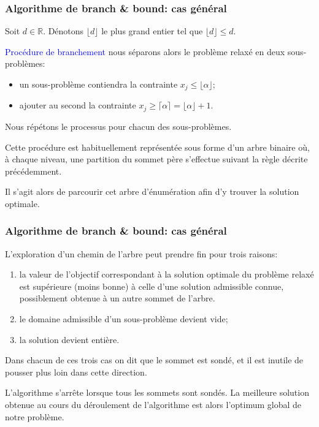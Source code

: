 \documentclass[usepdftitle=false, aspectratio=169]{beamer}
\begin{document}
\begin{frame}
\frametitle{Algorithme de branch \& bound: cas général}

Soit $d \in \mathbb{R}$. Dénotons $\lfloor d \rfloor$ le plus grand entier tel que $\lfloor d \rfloor \leq d$.

\mbox{}

\textcolor{blue}{Procédure de branchement} nous séparons alors le problème relaxé en deux sous-problèmes:
\begin{itemize}
	\item 
un sous-problème contiendra la contrainte $x_j \leq \lfloor \alpha \rfloor$;
\item
ajouter au second la contrainte $x_j \geq \lceil \alpha \rceil  = \lfloor \alpha \rfloor + 1$.
\end{itemize}
Nous répétons le processus pour chacun des sous-problèmes.

\mbox{}

Cette procédure est habituellement représentée sous forme
d'un arbre binaire où, à chaque niveau, une partition du sommet père s'effectue suivant la règle décrite précédemment.

\mbox{}

Il s'agit alors de parcourir cet arbre d'énumération afin d'y trouver la solution optimale.

\end{frame}

\begin{frame}
\frametitle{Algorithme de branch \& bound: cas général}

L'exploration d'un chemin de l'arbre peut prendre fin pour trois raisons:
\begin{enumerate}
\item
la valeur de l'objectif correspondant à la solution optimale du problème relaxé est supérieure (moins bonne) à celle d'une solution admissible connue, possiblement obtenue à un autre sommet de l'arbre.
\item
le domaine admissible d'un sous-problème devient vide;
\item
la solution devient entière.
\end{enumerate}
Dans chacun de ces trois cas on dit que le sommet est sondé, et il est inutile de pousser plus loin dans cette direction.

\mbox{}

L'algorithme s'arrête lorsque tous les sommets sont sondés.
La meilleure solution obtenue au cours du déroulement de l'algorithme est alors l'optimum global de notre problème.

\end{frame}
\end{document}
